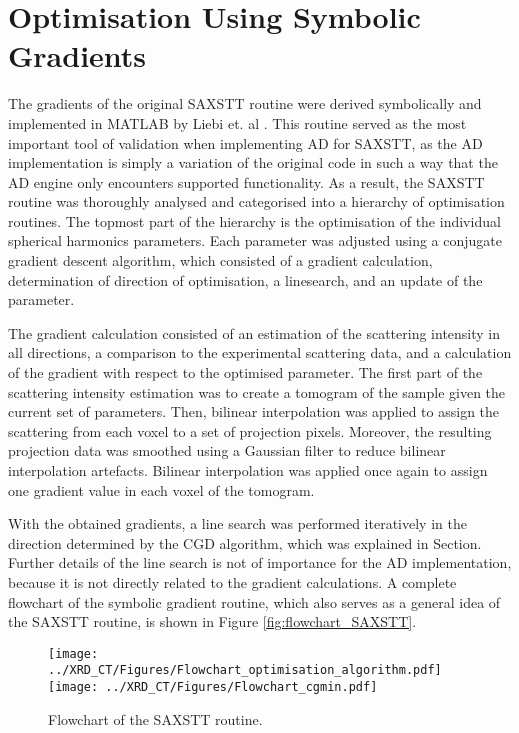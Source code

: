 \section{Optimisation Using Symbolic Gradients}
The gradients of the original SAXSTT routine were derived symbolically and implemented in MATLAB by Liebi et. al \cite{liebi2015nanostructure}.
This routine served as the most important tool of validation when implementing AD for SAXSTT,
as the AD implementation is simply a variation of the original code in such a way that the AD engine only encounters supported functionality.
As a result, the SAXSTT routine was thoroughly analysed and categorised into a hierarchy of optimisation routines. %
The topmost part of the hierarchy is the optimisation of the individual spherical harmonics parameters.
Each parameter was adjusted using a conjugate gradient descent algorithm,
which consisted of a gradient calculation, determination of direction of optimisation, a linesearch, and an update of the parameter.

The gradient calculation consisted of an estimation of the scattering intensity in all directions, a comparison to the experimental scattering data,
and a calculation of the gradient with respect to the optimised parameter.
The first part of the scattering intensity estimation was to create a tomogram of the sample given the current set of parameters.
Then, bilinear interpolation was applied to assign the scattering from each voxel to a set of projection pixels.
Moreover, the resulting projection data was smoothed using a Gaussian filter to reduce bilinear interpolation artefacts.
Bilinear interpolation was applied once again to assign one gradient value in each voxel of the tomogram. %

With the obtained gradients, a line search was performed iteratively in the direction determined by the CGD algorithm, which was explained in Section. %
Further details of the line search is not of importance for the AD implementation, because it is not directly related to the gradient calculations.
A complete flowchart of the symbolic gradient routine, which also serves as a general idea of the SAXSTT routine, is shown in Figure \ref{fig:flowchart_SAXSTT}.

\begin{figure}
    \centering
    \texttt{[image: ../XRD\_CT/Figures/Flowchart\_optimisation\_algorithm.pdf]}
    \texttt{[image: ../XRD\_CT/Figures/Flowchart\_cgmin.pdf]}
    \caption{Flowchart of the SAXSTT routine.}
    \label{fig:flowchart_optimisation}
\end{figure}

